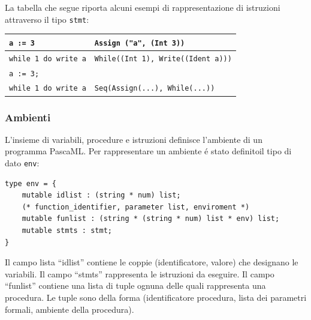 \documentclass[a4paper,10pt]{article}
\begin{document}
La tabella che segue riporta alcuni esempi di
rappresentazione di istruzioni attraverso il tipo \verb|stmt|:

\begin{center}
\begin{tabular}{|l|l|}
\hline
\verb|a := 3| & \verb|Assign ("a", (Int 3))| \\
\hline
\verb|while 1 do write a| &
 \verb|While((Int 1), Write((Ident a)))| \\
\hline
\verb|a := 3;|\\ \verb|while 1 do write a| &
 \verb|Seq(Assign(...), While(...))|\\
\hline
\end{tabular} 
\end{center}

\subsubsection{Ambienti}
L'insieme di variabili, procedure e istruzioni definisce l'ambiente di un
programma PascaML. Per rappresentare un ambiente \'e stato definitoil tipo di
dato \verb|env|:
\begin{verbatim}
type env = {
    mutable idlist : (string * num) list;
    (* function_identifier, parameter list, enviroment *)
    mutable funlist : (string * (string * num) list * env) list;    
    mutable stmts : stmt;
}
\end{verbatim}
Il campo lista ``idlist'' contiene le coppie (identificatore, valore) che
designano le
variabili. Il campo ``stmts'' rappresenta le istruzioni da eseguire. Il campo
``funlist'' contiene una lista di tuple ognuna delle quali rappresenta una
procedura. Le tuple sono della forma (identificatore procedura, lista dei
parametri formali, ambiente della procedura).
\end{document}
